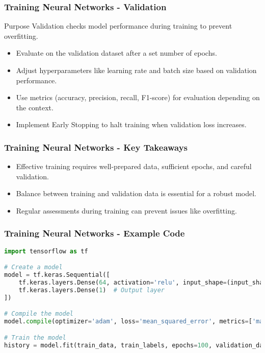 \documentclass[aspectratio=169]{beamer}
\begin{document}
\begin{frame}
    \frametitle{Training Neural Networks - Validation}
    \begin{block}{Purpose}
        Validation checks model performance during training to prevent overfitting.
    \end{block}
    
    \begin{itemize}
        \item Evaluate on the validation dataset after a set number of epochs.
        \item Adjust hyperparameters like learning rate and batch size based on validation performance.
        \item Use metrics (accuracy, precision, recall, F1-score) for evaluation depending on the context.
        \item Implement Early Stopping to halt training when validation loss increases.
    \end{itemize}
\end{frame}

\begin{frame}[fragile]
    \frametitle{Training Neural Networks - Key Takeaways}
    \begin{itemize}
        \item Effective training requires well-prepared data, sufficient epochs, and careful validation.
        \item Balance between training and validation data is essential for a robust model.
        \item Regular assessments during training can prevent issues like overfitting.
    \end{itemize}
\end{frame}

\begin{frame}[fragile]
    \frametitle{Training Neural Networks - Example Code}
    \begin{lstlisting}[language=Python]
import tensorflow as tf

# Create a model
model = tf.keras.Sequential([
    tf.keras.layers.Dense(64, activation='relu', input_shape=(input_shape,)),
    tf.keras.layers.Dense(1)  # Output layer
])

# Compile the model
model.compile(optimizer='adam', loss='mean_squared_error', metrics=['mae'])

# Train the model
history = model.fit(train_data, train_labels, epochs=100, validation_data=(val_data, val_labels))
    \end{lstlisting}
\end{frame}
\end{document}
